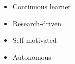 \twocolumnsection
{
\begin{skills}
\end{skills}}
{
\vspace{1em}
\begin{itemize}
	\item Continuous learner
	\item Research-driven
	\item Self-motivated
	\item Autonomous
\end{itemize}
}
